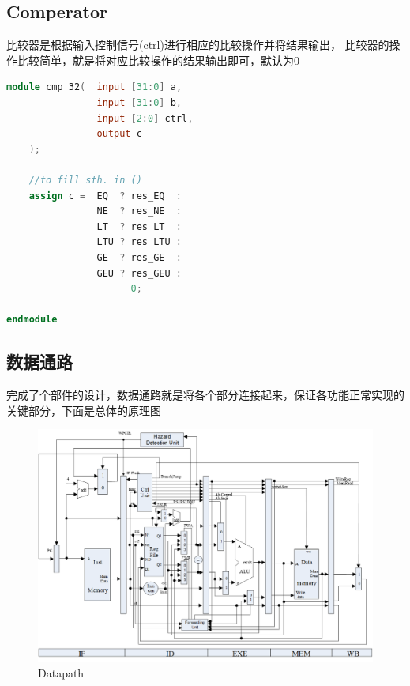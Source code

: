 \subsection{Comperator}
比较器是根据输入控制信号(ctrl)进行相应的比较操作并将结果输出，
比较器的操作比较简单，就是将对应比较操作的结果输出即可，默认为0

\begin{lstlisting}[language = {verilog}]
module cmp_32(  input [31:0] a,
                input [31:0] b,
                input [2:0] ctrl,
                output c
    );

    //to fill sth. in ()
    assign c =  EQ  ? res_EQ  : 
                NE  ? res_NE  : 
                LT  ? res_LT  : 
                LTU ? res_LTU :
                GE  ? res_GE  :
                GEU ? res_GEU :
                      0;          

endmodule
\end{lstlisting}

\subparagraph{}

\subsection{数据通路}
完成了个部件的设计，数据通路就是将各个部分连接起来，保证各功能正常实现的关键部分，下面是总体的原理图

\begin{figure}[H] %
    \centering %
    \includegraphics[width=1.0\textwidth]{DataPath.png} %
    \caption{Datapath} %
    \label{Fig.2} %
\end{figure}

